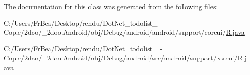 The documentation for this class was generated from the following files:\begin{CompactItemize}
\item 
C:/Users/FrBea/Desktop/rendu/DotNet\_\-todolist\_ - Copie/2doo/\_\-2doo.Android/obj/Debug/android/android/support/coreui/\hyperlink{android_2support_2coreui_2_r_8java}{R.java}\item 
C:/Users/FrBea/Desktop/rendu/DotNet\_\-todolist\_ - Copie/2doo/\_\-2doo.Android/obj/Debug/android/src/android/support/coreui/\hyperlink{src_2android_2support_2coreui_2_r_8java}{R.java}\end{CompactItemize}
